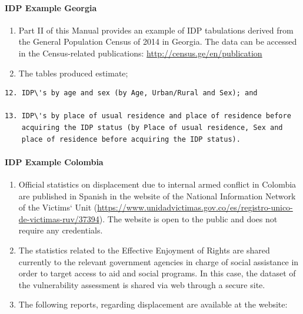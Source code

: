 \documentclass[
]{article}
\begin{document}
\hypertarget{idp-example-georgia}{%
\paragraph{IDP Example Georgia}\label{idp-example-georgia}}

\begin{enumerate}
\def\labelenumi{\arabic{enumi}.}
\setcounter{enumi}{415}
\item
  Part II of this Manual provides an example of IDP tabulations
  derived from the General Population Census of 2014 in Georgia. The
  data can be accessed in the Census-related publications:
  \url{http://census.ge/en/publication}
\item
  The tables produced estimate;
\end{enumerate}

\begin{verbatim}
12. IDP\'s by age and sex (by Age, Urban/Rural and Sex); and

13. IDP\'s by place of usual residence and place of residence before
    acquiring the IDP status (by Place of usual residence, Sex and
    place of residence before acquiring the IDP status).
\end{verbatim}

\hypertarget{idp-example-colombia}{%
\paragraph{IDP Example Colombia}\label{idp-example-colombia}}

\begin{enumerate}
\def\labelenumi{\arabic{enumi}.}
\setcounter{enumi}{417}
\item
  Official statistics on displacement due to internal armed conflict
  in Colombia are published in Spanish in the website of the National
  Information Network of the Victims` Unit
  (\url{https://www.unidadvictimas.gov.co/es/registro-unico-de-victimas-ruv/37394}).
  The website is open to the public and does not require any
  credentials.
\item
  The statistics related to the Effective Enjoyment of Rights are
  shared currently to the relevant government agencies in charge of
  social assistance in order to target access to aid and social
  programs. In this case, the dataset of the vulnerability assessment
  is shared via web through a secure site.
\item
  The following reports, regarding displacement are available at the
  website:
\end{enumerate}
\end{document}
